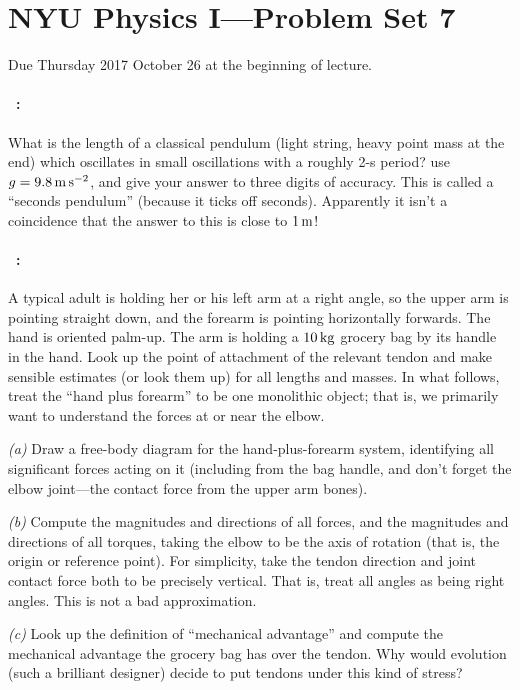 \documentclass[12pt]{article}
\begin{document}
\section*{NYU Physics I---Problem Set 7}

Due Thursday 2017 October 26 at the beginning of lecture.

\paragraph{\problemname~\theproblem:}%
What is the length of a classical pendulum (light string, heavy point
mass at the end) which oscillates in small oscillations with a roughly
2-s period? use $g=9.8\,\mathrm{m}\,\mathrm{s}^{-2}$, and give your answer to three digits of
accuracy. This is called a ``seconds pendulum'' (because it ticks off
seconds). Apparently it isn't a coincidence that the answer to this is
close to $1\,\mathrm{m}$!

\paragraph{\problemname~\theproblem:}%
A typical adult is holding her or his left arm at a right angle, so the
upper arm is pointing straight down, and the forearm is pointing
horizontally forwards.  The hand is oriented palm-up.  The arm is holding a
$10\,\mathrm{kg}$ grocery bag by its handle in the hand.  Look up the
point of attachment of the relevant tendon and make sensible estimates
(or look them up) for all lengths and masses.  In what follows, treat
the ``hand plus forearm'' to be one monolithic object; that is, we
primarily want to understand the forces at or near the elbow.

\textsl{(a)} Draw a free-body diagram for the hand-plus-forearm
system, identifying all significant forces acting on it (including
from the bag handle, and don't forget the elbow joint---the contact
force from the upper arm bones).

\textsl{(b)} Compute the magnitudes and directions of all forces, and
the magnitudes and directions of all torques, taking the elbow to be
the axis of rotation (that is, the origin or reference point).  For
simplicity, take the tendon direction and joint contact force both to
be precisely vertical.  That is, treat all angles as being right
angles.  This is not a bad approximation.

\textsl{(c)} Look up the definition of ``mechanical advantage'' and
compute the mechanical advantage the grocery bag has over the tendon.
Why would evolution (such a brilliant designer) decide to put tendons
under this kind of stress?
\end{document}
